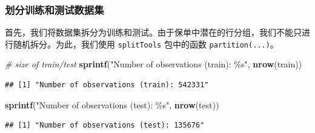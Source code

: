 \documentclass[
]{article}
\newenvironment{Shaded}{\begin{snugshade}}{\end{snugshade}}
\newcommand{\AttributeTok}[1]{\textcolor[rgb]{0.13,0.29,0.53}{#1}}
\newcommand{\CommentTok}[1]{\textcolor[rgb]{0.56,0.35,0.01}{\textit{#1}}}
\newcommand{\FloatTok}[1]{\textcolor[rgb]{0.00,0.00,0.81}{#1}}
\newcommand{\FunctionTok}[1]{\textcolor[rgb]{0.13,0.29,0.53}{\textbf{#1}}}
\newcommand{\NormalTok}[1]{#1}
\newcommand{\OtherTok}[1]{\textcolor[rgb]{0.56,0.35,0.01}{#1}}
\newcommand{\SpecialCharTok}[1]{\textcolor[rgb]{0.81,0.36,0.00}{\textbf{#1}}}
\newcommand{\StringTok}[1]{\textcolor[rgb]{0.31,0.60,0.02}{#1}}
\begin{document}
\subsubsection{划分训练和测试数据集}\label{ux5212ux5206ux8badux7ec3ux548cux6d4bux8bd5ux6570ux636eux96c6-1}

首先，我们将数据集拆分为训练和测试。由于保单中潜在的行分组，我们不能只进行随机拆分。为此，我们使用
\texttt{splitTools} 包中的函数 \texttt{partition(...)}。

\begin{Shaded}
\end{Shaded}

\begin{Shaded}
\begin{Highlighting}[]
\CommentTok{\# size of train/test}
\FunctionTok{sprintf}\NormalTok{(}\StringTok{"Number of observations (train): \%s"}\NormalTok{, }\FunctionTok{nrow}\NormalTok{(train))}
\end{Highlighting}
\end{Shaded}

\begin{verbatim}
## [1] "Number of observations (train): 542331"
\end{verbatim}

\begin{Shaded}
\begin{Highlighting}[]
\FunctionTok{sprintf}\NormalTok{(}\StringTok{"Number of observations (test): \%s"}\NormalTok{, }\FunctionTok{nrow}\NormalTok{(test))}
\end{Highlighting}
\end{Shaded}

\begin{verbatim}
## [1] "Number of observations (test): 135676"
\end{verbatim}
\end{document}

